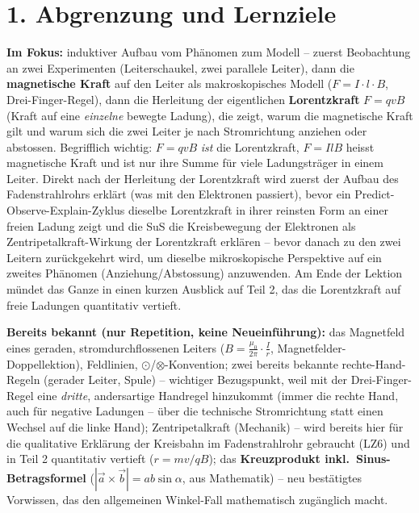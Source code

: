 \documentclass[11pt,a4paper]{article}
\begin{document}
\section*{1. Abgrenzung und Lernziele}

\textbf{Im Fokus:} induktiver Aufbau vom Phänomen zum Modell -- zuerst
Beobachtung an zwei Experimenten (Leiterschaukel, zwei parallele Leiter),
dann die \textbf{magnetische Kraft} auf den Leiter als makroskopisches
Modell ($F=I\cdot l\cdot B$, Drei-Finger-Regel), dann die Herleitung der
eigentlichen \textbf{Lorentzkraft} $F=qvB$ (Kraft auf eine \emph{einzelne}
bewegte Ladung), die zeigt, warum die magnetische Kraft gilt und warum
sich die zwei Leiter je nach Stromrichtung anziehen oder abstossen.
Begrifflich wichtig: $F=qvB$ \emph{ist} die Lorentzkraft, $F=IlB$ heisst
magnetische Kraft und ist nur ihre Summe für viele Ladungsträger in einem
Leiter. Direkt nach der Herleitung der Lorentzkraft wird zuerst der Aufbau
des Fadenstrahlrohrs erklärt (was mit den Elektronen passiert), bevor ein
Predict-Observe-Explain-Zyklus dieselbe Lorentzkraft in ihrer reinsten
Form an einer freien Ladung zeigt und die SuS die Kreisbewegung der
Elektronen als Zentripetalkraft-Wirkung der Lorentzkraft erklären --
bevor danach zu den zwei Leitern
zurückgekehrt wird, um dieselbe mikroskopische Perspektive auf ein
zweites Phänomen (Anziehung/Abstossung) anzuwenden. Am Ende der Lektion
mündet das Ganze in einen kurzen Ausblick auf Teil 2, das die Lorentzkraft
auf freie Ladungen quantitativ vertieft.

\textbf{Bereits bekannt (nur Repetition, keine Neueinführung):} das
Magnetfeld eines geraden, stromdurchflossenen Leiters
($B=\frac{\mu_0}{2\pi}\cdot\frac{I}{r}$, Magnetfelder-Doppellektion),
Feldlinien, $\odot$/$\otimes$-Konvention; zwei bereits bekannte
rechte-Hand-Regeln (gerader Leiter, Spule) -- wichtiger Bezugspunkt, weil
mit der Drei-Finger-Regel eine \emph{dritte}, andersartige Handregel
hinzukommt (immer die rechte Hand, auch für negative Ladungen -- über die
technische Stromrichtung statt einen Wechsel auf die linke Hand);
Zentripetalkraft (Mechanik) -- wird bereits hier für die qualitative
Erklärung der Kreisbahn im Fadenstrahlrohr gebraucht (LZ6) und in Teil 2
quantitativ vertieft ($r=mv/qB$); das
\textbf{Kreuzprodukt inkl.\ Sinus-Betragsformel} ($|\vec a\times\vec
b|=ab\sin\alpha$, aus Mathematik) -- neu bestätigtes Vorwissen, das den
allgemeinen Winkel-Fall mathematisch zugänglich macht.
\end{document}
